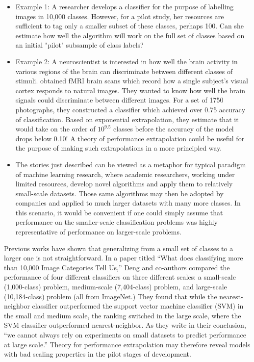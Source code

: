 \documentclass[12pt]{article}
\begin{document}
\begin{itemize} 
\item Example 1: A researcher develops a classifier for the purpose of labelling
images in 10,000 classes. However, for a pilot study, her resources are sufficient to 
tag only a smaller subset of these classes, perhaps 100. Can she estimate how well the algorithm 
will work on the full set of classes based on an initial "pilot" subsample of class labels?
\item Example 2: A neuroscientist is interested in how well the brain
  activity in various regions of the brain can discriminate between
  different classes of stimuli.  \cite{Kay2008a} obtained fMRI brain
  scans which record how a single subject's visual cortex responds to
  natural images. They wanted to know how well the brain signals could
  discriminate between different images. For a set of 1750
  photographs, they constructed a classifier which achieved over 0.75
  accuracy of classification. Based on exponential extrapolation, they
  estimate that it would take on the order of $10^{9.5}$ classes
  before the accuracy of the model drops below 0.10!  A theory of
  performance extrapolation could be useful for the purpose of making
  such extrapolations in a more principled way.
\item The stories just described can be viewed as a metaphor for
  typical paradigm of machine learning research, where academic
  researchers, working under limited resources, develop novel
  algorithms and apply them to relatively small-scale datasets. Those
  same algorithms may then be adopted by companies and applied to much
  larger datasets with many more classes. In this scenario, it would
  be convenient if one could simply assume that performance on the
  smaller-scale classification problems was highly representative of
  performance on larger-scale problems.
\end{itemize}

Previous works have shown that generalizing from a small set of
classes to a larger one is not straightforward. In a paper titled
``What does classifying more than 10,000 Image Categories Tell Us,''
Deng and co-authors compared the performance of four different
classifiers on three different scales: a small-scale (1,000-class)
problem, medium-scale (7,404-class) problem, and large-scale
(10,184-class) problem (all from ImageNet.)  They found that while the
nearest-neighbor classifier outperformed the support vector machine
classifier (SVM) in the small and medium scale, the ranking switched
in the large scale, where the SVM classifier outperformed
nearest-neighbor.  As they write in their conclusion, ``we cannot
always rely on experiments on small datasets to predict performance at
large scale.'' Theory for performance extrapolation may therefore
reveal models with bad scaling properties in the pilot stages of
development.
\end{document}
